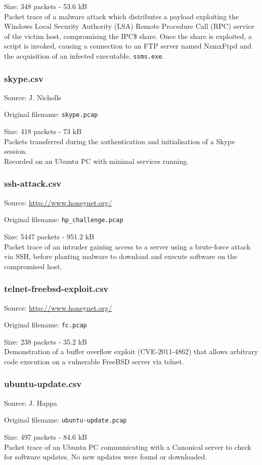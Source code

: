 \documentclass[12pt,a4paper]{article}
\newcommand{\dbl}{\\[\baselineskip]}
\begin{document}
	Size: 348 packets - 53.6 kB\dbl
	Packet trace of a malware attack which distributes a
	payload exploiting the Windows Local Security Authority
	(LSA) Remote Procedure Call (RPC) service of the victim
	host, compromising the IPC\$ share. Once the share is
	exploited, a script is invoked, causing a connection to an
	FTP server named NzmxFtpd and the acquisition of an
	infected executable, \verb!ssms.exe!.
	
	\subsubsection*{skype.csv}
	Source: J. Nicholls
	
	Original filename: \verb|skype.pcap|
	
	Size: 418 packets - 73 kB\dbl
	Packets transferred during the authentication and
	initialisation of a Skype session.\\ Recorded on an Ubuntu
	PC with minimal services running.
	
	\subsubsection*{ssh-attack.csv}
	Source: \url{http://www.honeynet.org/}
	
	Original filename: \verb|hp_challenge.pcap|
	
	Size: 5447 packets - 951.2 kB\dbl
	Packet trace of an intruder gaining access to a server
	using a brute-force attack via SSH, before planting malware
	to download and execute software on the compromised host.
	
	\subsubsection*{telnet-freebsd-exploit.csv}
	Source: \url{http://www.honeynet.org/}
	
	Original filename: \verb|fc.pcap|
	
	Size: 238 packets - 35.2 kB\dbl
	Demonstration of a buffer overflow exploit (CVE-2011-4862)
	that allows arbitrary code execution on a vulnerable
	FreeBSD server via telnet.
	
	\subsubsection*{ubuntu-update.csv}
	Source: J. Happa
	
	Original filename: \verb|ubuntu-update.pcap|
	
	Size: 497 packets - 84.6 kB\dbl
	Packet trace of an Ubuntu PC communicating with a Canonical
	server to check for software updates. No new updates were
	found or downloaded.
	
\end{document}
